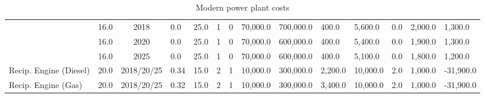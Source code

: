 \begin{table*}[]
\begin{tabularx}{\linewidth}{|p{}|l|c|l|l|l|l|l|l|l|l|l|l|l|}
& 16.0 & 2018 & 0.0 & 25.0 & 1 & 0 & 70,000.0 & 700,000.0 & 400.0 & 5,600.0 & 0.0 & 2,000.0 & 1,300.0 \\ \cline{2-14} 
& 16.0 & 2020 & 0.0 & 25.0 & 1 & 0 & 70,000.0 & 600,000.0 & 400.0 & 5,400.0 & 0.0 & 1,900.0 & 1,300.0 \\ \cline{2-14} 
& 16.0 & 2025 & 0.0 & 25.0 & 1 & 0 & 70,000.0 & 600,000.0 & 400.0 & 5,100.0 & 0.0 & 1,800.0 & 1,200.0 \\ \hline
Recip. Engine (Diesel) & 20.0 & 2018/20/25 & 0.34 & 15.0 & 2 & 1 & 10,000.0 & 300,000.0 & 2,200.0 & 10,000.0 & 2.0 & 1,000.0 & -31,900.0 \\ \hline
Recip. Engine (Gas) & 20.0 & 2018/20/25 & 0.32 & 15.0 & 2 & 1 & 10,000.0 & 300,000.0 & 3,400.0 & 10,000.0 & 2.0 & 1,000.0 & -31,900.0 \\ \hline

		\end{tabularx}
		\caption{Modern power plant costs \cite{Department2016}}
		\label{table:modern_plant_costs}
\end{table*}


